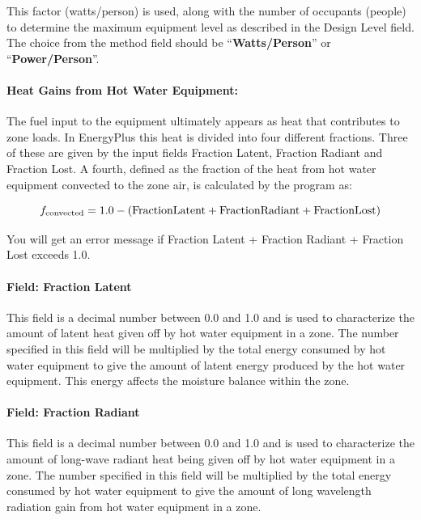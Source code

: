This factor (watts/person) is used, along with the number of occupants (people) to determine the maximum equipment level as described in the Design Level field. The choice from the method field should be ``\textbf{Watts/Person}'' or ``\textbf{Power/Person}''.

\paragraph{Heat Gains from Hot Water Equipment:}\label{heat-gains-from-hot-water-equipment-hw-definition}

The fuel input to the equipment ultimately appears as heat that contributes to zone loads. In EnergyPlus this heat is divided into four different fractions. Three of these are given by the input fields Fraction Latent, Fraction Radiant and Fraction Lost. A fourth, defined as the fraction of the heat from hot water equipment convected to the zone air, is calculated by the program as:

\begin{equation}
  f_{\rm{convected}} = 1.0 - (\rm{Fraction Latent} + \rm{Fraction Radiant} + \rm{Fraction Lost})
\end{equation}

You will get an error message if Fraction Latent + Fraction Radiant + Fraction Lost exceeds 1.0.

\paragraph{Field: Fraction Latent}\label{field-fraction-latent-2-hw-definition}

This field is a decimal number between 0.0 and 1.0 and is used to characterize the amount of latent heat given off by hot water equipment in a zone. The number specified in this field will be multiplied by the total energy consumed by hot water equipment to give the amount of latent energy produced by the hot water equipment. This energy affects the moisture balance within the zone.

\paragraph{Field: Fraction Radiant}\label{field-fraction-radiant-4-hw-definition}

This field is a decimal number between 0.0 and 1.0 and is used to characterize the amount of long-wave radiant heat being given off by hot water equipment in a zone. The number specified in this field will be multiplied by the total energy consumed by hot water equipment to give the amount of long wavelength radiation gain from hot water equipment in a zone.

